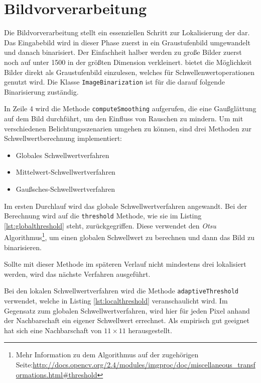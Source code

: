 \chapter{Bildvorverarbeitung}
Die Bildvorverarbeitung stellt ein essenziellen Schritt zur Lokalisierung der \QRCodes dar. Das Eingabebild wird in dieser Phase zuerst in ein Graustufenbild umgewandelt und danach binarisiert. Der Einfachheit halber werden zu große Bilder zuerst noch auf unter 1500 in der größten Dimension verkleinert. \OpenCV bietet die Möglichkeit Bilder direkt als Graustufenbild einzulesen, welches für Schwellenwertoperationen genutzt wird.
Die Klasse \texttt{ImageBinarization} ist für die darauf folgende Binarisierung zuständig. 

In Zeile 4 wird die Methode \texttt{computeSmoothing} aufgerufen, die eine Gaußglättung auf dem Bild durchführt, um den Einfluss von Rauschen zu mindern. Um mit verschiedenen Belichtungsszenarien umgehen zu können, sind drei Methoden zur Schwellwertberechnung implementiert:
\begin{itemize}
	\item Globales Schwellwertverfahren
	\item Mittelwert-Schwellwertverfahren
	\item Gaußsches-Schwellwertverfahren
\end{itemize}
Im ersten Durchlauf wird das globale Schwellwertverfahren angewandt. Bei der Berechnung wird auf die \texttt{threshold} Methode, wie sie im Listing \ref{lst:globalthreshold} steht, zurückgegriffen. Diese verwendet den \emph{Otsu} Algorithmus\footnote{Mehr Information zu dem Algorithmus auf der zugehörigen \OpenCV Seite:\url{http://docs.opencv.org/2.4/modules/imgproc/doc/miscellaneous_transformations.html\#threshold}}, um einen globalen Schwellwert zu berechnen und dann das Bild zu binarisieren. \cite{opencv}

Sollte mit dieser Methode im späteren Verlauf nicht mindestens drei \fps lokalisiert werden, wird das nächste Verfahren ausgeführt.


Bei den lokalen Schwellwertverfahren wird die Methode \texttt{adaptiveThreshold} verwendet, welche in Listing \ref{lst:localthreshold} veranschaulicht wird. Im Gegensatz zum globalen Schwellwertverfahren, wird hier für jeden Pixel anhand der Nachbarschaft ein eigener Schwellwert errechnet. Als empirisch gut geeignet hat sich eine Nachbarschaft von $11 \times 11$ herausgestellt.

